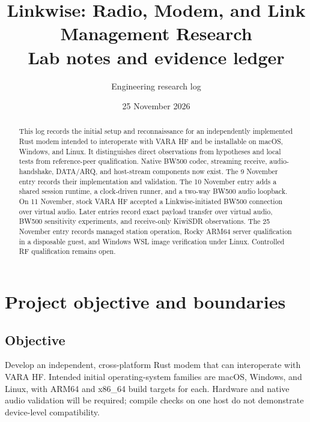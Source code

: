 \documentclass[11pt,a4paper]{article}
\title{Linkwise: Radio, Modem, and Link Management Research\\[0.4em]
\large Lab notes and evidence ledger}
\author{Engineering research log}
\date{25 November 2026}
\begin{document}
\maketitle

\begin{abstract}
This log records the initial setup and reconnaissance for an independently
implemented Rust modem intended to interoperate with VARA HF and be installable
on macOS, Windows, and Linux. It distinguishes direct observations from
hypotheses and local tests from reference-peer qualification. Native BW500
codec, streaming receive, audio-handshake, DATA/ARQ, and host-stream components
now exist. The 9 November entry records their implementation and validation.
The 10 November entry adds a shared session runtime, a clock-driven runner, and
a two-way BW500 audio loopback. On 11 November, stock VARA HF accepted
a Linkwise-initiated BW500 connection over virtual audio. Later entries record
exact payload transfer over virtual audio, BW500 sensitivity experiments, and
receive-only KiwiSDR observations. The 25 November entry records managed
station operation, Rocky ARM64 server qualification in a disposable guest,
and Windows WSL image verification under Linux. Controlled RF qualification
remains open.
\end{abstract}

\tableofcontents
\newpage

\section{Project objective and boundaries}

\subsection{Objective}
Develop an independent, cross-platform Rust modem that can interoperate with
VARA HF. Intended initial operating-system families are macOS, Windows, and
Linux, with ARM64 and x86\_64 build targets for each. Hardware and native audio
validation will be required; compile checks on one host do not demonstrate
device-level compatibility.
\end{document}
